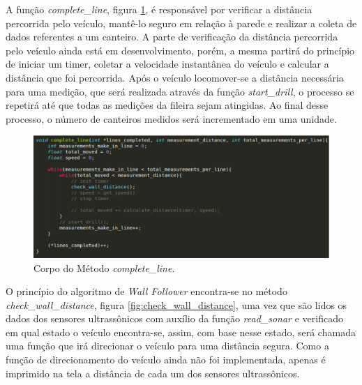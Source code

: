   A função \textit{complete\_line}, figura \ref{fig:complete_line}, é responsável por verificar a distância percorrida pelo veículo, mantê-lo
  seguro em relação à parede e realizar a coleta de dados referentes a um canteiro. A parte de verificação
  da distância percorrida pelo veículo ainda está em desenvolvimento, porém, a mesma partirá do princípio
  de iniciar um timer, coletar a velocidade instantânea do veículo e calcular a distância que foi percorrida.
  Após o veículo locomover-se a distância necessária para uma medição, que
  será realizada através da função \textit{start\_drill}, o processo se repetirá até que todas as medições da fileira sejam atingidas. Ao final desse processo, o número de canteiros medidos será incrementado em uma unidade.

  \begin{figure}[!htbp]
  \begin{center}
  \includegraphics[width=1\textwidth]{figuras/complete_line.eps}
  \caption{\label{fig:complete_line}Corpo do Método \textit{complete\_line}.}
  \end{center}
  \end{figure}

  O princípio do algoritmo de \textit{Wall Follower} encontra-se no método \textit{check\_wall\_distance}, figura \ref{fig:check_wall_distance}, uma vez que são lidos os dados dos sensores ultrassônicos com auxílio
  da função \textit{read\_sonar} e verificado em qual estado o veículo encontra-se, assim, com base nesse estado, será chamada uma função que irá direcionar o veículo para uma distância segura. Como a função de direcionamento do veículo ainda não foi implementada, apenas é imprimido na tela a distância de cada um dos sensores ultrassônicos.

